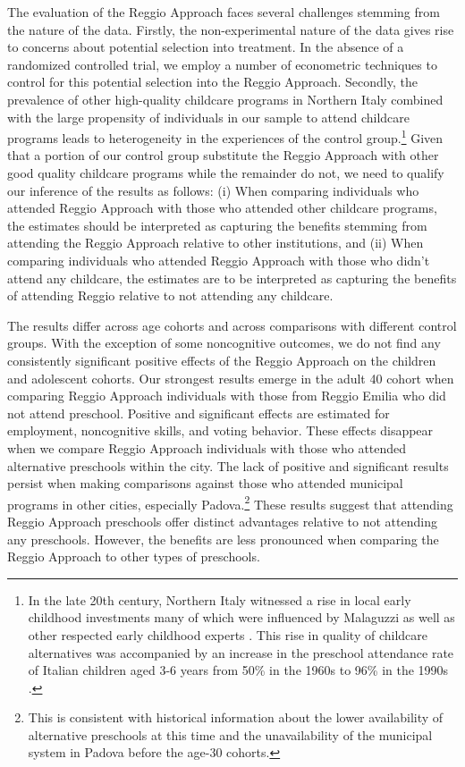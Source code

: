 The evaluation of the Reggio Approach faces several challenges stemming from the nature of the data. Firstly, the non-experimental nature of the data gives rise to concerns about potential selection into treatment. In the absence of a randomized controlled trial, we employ a number of econometric techniques to control for this potential selection into the Reggio Approach. Secondly, the prevalence of other high-quality childcare programs in Northern Italy combined with the large propensity of individuals in our sample to attend childcare programs leads to heterogeneity in the experiences of the control group.\footnote{In the late 20th century, Northern Italy witnessed a rise in local early childhood investments many of which were influenced by Malaguzzi as well as other respected early childhood experts \citep{OECD_2001_Italy-Country-Note}. This rise in quality of childcare alternatives was accompanied by an increase in the preschool attendance rate of Italian children aged 3-6 years from 50\% in the 1960s to 96\% in the 1990s \citep{Hohnerlein_2015_Development-and-Diffusion}.} Given that a portion of our control group substitute the Reggio Approach with other good quality childcare programs while the remainder do not, we need to qualify our inference of the results as follows: (i) When comparing individuals who attended Reggio Approach with those who attended other childcare programs, the estimates should be interpreted as capturing the benefits stemming from attending the Reggio Approach relative to other institutions, and (ii) When comparing individuals who attended Reggio Approach with those who didn't attend any childcare, the estimates are to be interpreted as capturing the benefits of attending Reggio relative to not attending any childcare.

The results differ across age cohorts and across comparisons with different control groups. With the exception of some noncognitive outcomes, we do not find any consistently significant positive effects of the Reggio Approach on the children and adolescent cohorts. Our strongest results emerge in the adult 40 cohort when comparing Reggio Approach individuals with those from Reggio Emilia who did not attend preschool. Positive and significant effects are estimated for employment, noncognitive skills, and voting behavior. These effects disappear when we compare Reggio Approach individuals with those who attended alternative preschools within the city. The lack of positive and significant results persist when making comparisons against those who attended municipal programs in other cities, especially Padova.\footnote{This is consistent with historical information about the lower availability of alternative preschools at this time and the unavailability of the municipal system in Padova before the age-30 cohorts.} These results suggest that attending Reggio Approach preschools offer distinct advantages relative to not attending any preschools. However, the benefits are less pronounced when comparing the Reggio Approach to other types of preschools. 

